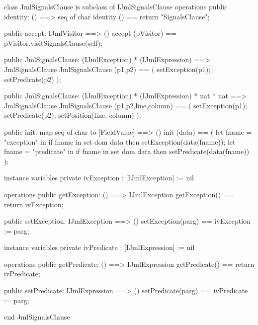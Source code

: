 \begin{vdm_al}
class JmlSignalsClause is subclass of IJmlSignalsClause
operations
  public identity: () ==> seq of char
  identity () == return "SignalsClause";

  public accept: IJmlVisitor ==> ()
  accept (pVisitor) == pVisitor.visitSignalsClause(self);

  public JmlSignalsClause:
    (IJmlException) *
    (IJmlExpression) ==> JmlSignalsClause
  JmlSignalsClause (p1,p2) == 
    ( setException(p1);
      setPredicate(p2) );

  public JmlSignalsClause:
    (IJmlException) *
    (IJmlExpression) *
    nat *
    nat ==> JmlSignalsClause
  JmlSignalsClause (p1,p2,line,column) == 
    ( setException(p1);
      setPredicate(p2);
      setPosition(line, column) );

  public init: map seq of char to [FieldValue] ==> ()
  init (data) ==
    ( let fname = "exception" in
        if fname in set dom data
        then setException(data(fname));
      let fname = "predicate" in
        if fname in set dom data
        then setPredicate(data(fname)) );

instance variables
  private ivException : [IJmlException] := nil

operations
  public getException: () ==> IJmlException
  getException() == return ivException;

  public setException: IJmlException ==> ()
  setException(parg) == ivException := parg;

instance variables
  private ivPredicate : [IJmlExpression] := nil

operations
  public getPredicate: () ==> IJmlExpression
  getPredicate() == return ivPredicate;

  public setPredicate: IJmlExpression ==> ()
  setPredicate(parg) == ivPredicate := parg;

end JmlSignalsClause
\end{vdm_al}

